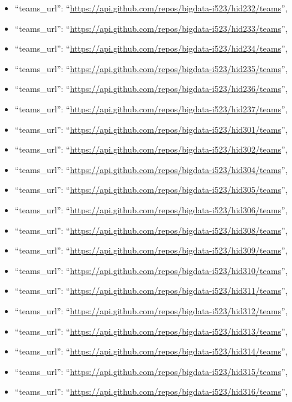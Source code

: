\begin{itemize}
\item
  ``teams\_url'':
  ``\url{https://api.github.com/repos/bigdata-i523/hid232/teams}'',
\item
  ``teams\_url'':
  ``\url{https://api.github.com/repos/bigdata-i523/hid233/teams}'',
\item
  ``teams\_url'':
  ``\url{https://api.github.com/repos/bigdata-i523/hid234/teams}'',
\item
  ``teams\_url'':
  ``\url{https://api.github.com/repos/bigdata-i523/hid235/teams}'',
\item
  ``teams\_url'':
  ``\url{https://api.github.com/repos/bigdata-i523/hid236/teams}'',
\item
  ``teams\_url'':
  ``\url{https://api.github.com/repos/bigdata-i523/hid237/teams}'',
\item
  ``teams\_url'':
  ``\url{https://api.github.com/repos/bigdata-i523/hid301/teams}'',
\item
  ``teams\_url'':
  ``\url{https://api.github.com/repos/bigdata-i523/hid302/teams}'',
\item
  ``teams\_url'':
  ``\url{https://api.github.com/repos/bigdata-i523/hid304/teams}'',
\item
  ``teams\_url'':
  ``\url{https://api.github.com/repos/bigdata-i523/hid305/teams}'',
\item
  ``teams\_url'':
  ``\url{https://api.github.com/repos/bigdata-i523/hid306/teams}'',
\item
  ``teams\_url'':
  ``\url{https://api.github.com/repos/bigdata-i523/hid308/teams}'',
\item
  ``teams\_url'':
  ``\url{https://api.github.com/repos/bigdata-i523/hid309/teams}'',
\item
  ``teams\_url'':
  ``\url{https://api.github.com/repos/bigdata-i523/hid310/teams}'',
\item
  ``teams\_url'':
  ``\url{https://api.github.com/repos/bigdata-i523/hid311/teams}'',
\item
  ``teams\_url'':
  ``\url{https://api.github.com/repos/bigdata-i523/hid312/teams}'',
\item
  ``teams\_url'':
  ``\url{https://api.github.com/repos/bigdata-i523/hid313/teams}'',
\item
  ``teams\_url'':
  ``\url{https://api.github.com/repos/bigdata-i523/hid314/teams}'',
\item
  ``teams\_url'':
  ``\url{https://api.github.com/repos/bigdata-i523/hid315/teams}'',
\item
  ``teams\_url'':
  ``\url{https://api.github.com/repos/bigdata-i523/hid316/teams}'',

\end{itemize}
